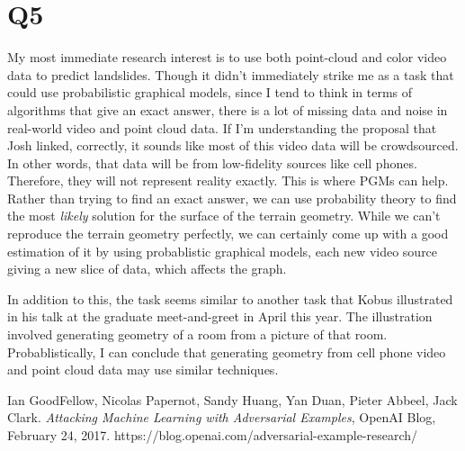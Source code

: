 \documentclass{article}
\begin{document}
\section{Q5}

My most immediate research interest is to use both point-cloud and color video 
data to predict landslides. Though it didn't immediately strike me as a task 
that could use probabilistic graphical models, since I tend to think in terms 
of algorithms that give an exact answer, there is a lot of missing data and 
noise in real-world video and point cloud data. If I'm understanding the 
proposal that Josh linked, correctly, it sounds like most of this video data 
will be crowdsourced. In other words, that data will be from low-fidelity 
sources like cell phones. Therefore, they will not represent reality exactly. 
This is where PGMs can help. Rather than trying to find an exact answer, we can 
use probability theory to find the most \textit{likely} solution for the 
surface of the terrain geometry. While we can't reproduce the terrain geometry 
perfectly, we can certainly come up with a good estimation of it by using 
probablistic graphical models, each new video source giving a new slice of 
data, which affects the graph.

In addition to this, the task seems similar to another task that Kobus 
illustrated in his talk at the graduate meet-and-greet in April this year. The 
illustration involved generating geometry of a room from a picture of that 
room. Probablistically, I can conclude that generating geometry from cell phone 
video and point cloud data may use similar techniques.

\begin{thebibliography}{99}

	 Ian GoodFellow, Nicolas Papernot, Sandy Huang, Yan Duan, Pieter Abbeel, Jack Clark. 
	\textit{Attacking Machine Learning with Adversarial Examples}, 
	OpenAI Blog, 
	February 24, 2017.
    https://blog.openai.com/adversarial-example-research/

\end{thebibliography}
\end{document}
